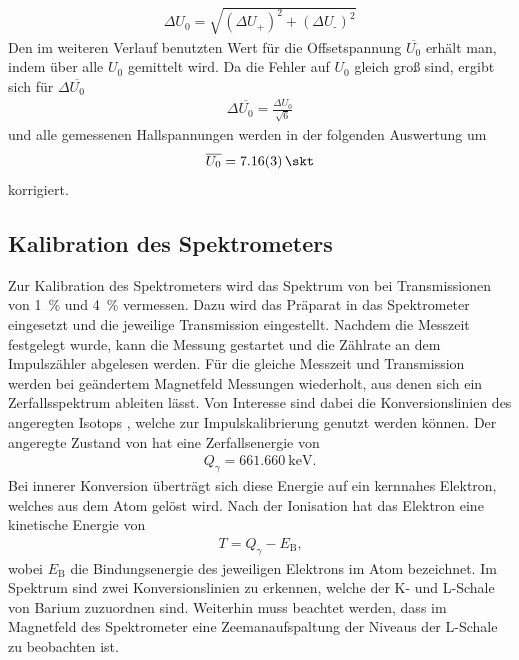 \documentclass[11pt, a4paper]{article}
\numberwithin{equation}{section}
\begin{document}
\begin{align}
	\Delta U_0 = \sqrt{(\Delta U_\text{+})^2 + (\Delta U_\text{-})^2}
\end{align}
Den im weiteren Verlauf benutzten Wert für die Offsetspannung $\overline{U_0}$ erhält man, indem über alle $U_0$ gemittelt wird. Da die Fehler auf $U_0$ gleich groß sind, ergibt sich für $\Delta\overline{U_0}$
\begin{align}
	\Delta\overline{U_0} = \frac{\Delta U_0}{\sqrt{6}}
\end{align}
und alle gemessenen Hallspannungen werden in der folgenden Auswertung um
\begin{align}
	\overline{U_0} = \SI{7.16 +- 0.03}{\skt}
	\label{hall_korrektur}
\end{align}
korrigiert.

\subsection{Kalibration des Spektrometers}
\label{ssec:kalibration}
Zur Kalibration des Spektrometers wird das Spektrum von  bei Transmissionen von \SI{1}{\percent} und \SI{4}{\percent} vermessen.
Dazu wird das Präparat in das Spektrometer eingesetzt und die jeweilige Transmission eingestellt.
Nachdem die Messzeit festgelegt wurde, kann die Messung gestartet und die Zählrate an dem Impulszähler abgelesen werden.
Für die gleiche Messzeit und Transmission werden bei geändertem Magnetfeld Messungen wiederholt, aus denen sich ein Zerfallsspektrum ableiten lässt.
Von Interesse sind dabei die Konversionslinien des angeregten Isotops , welche zur Impulskalibrierung genutzt werden können.
Der angeregte Zustand von  hat eine Zerfallsenergie von
\begin{align*}
	Q_\gamma = \SI{661,660}{\kilo\electronvolt}\text{.}
\end{align*}
Bei innerer Konversion überträgt sich diese Energie auf ein kernnahes Elektron, welches aus dem Atom gelöst wird.
Nach der Ionisation hat das Elektron eine kinetische Energie von
\begin{align}
	T = Q_\gamma - E_\mathrm{B} \text{,}
	\label{eq:kin_energie_konversion}
\end{align}
wobei $E_\mathrm{B}$ die Bindungsenergie des jeweiligen Elektrons im Atom bezeichnet.
Im Spektrum sind zwei Konversionslinien zu erkennen, welche der K- und L-Schale von Barium zuzuordnen sind.
Weiterhin muss beachtet werden, dass im Magnetfeld des Spektrometer eine Zeemanaufspaltung der Niveaus der L-Schale zu beobachten ist.
\end{document}
